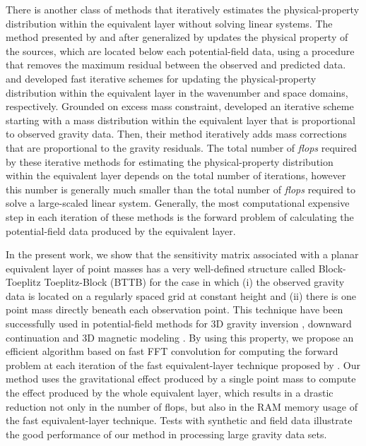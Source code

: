 There is another class of methods that iteratively estimates the physical-property distribution within 
the equivalent layer without solving linear systems.
The method presented by \citet{cordell1992} and after generalized by \citet{guspi-novara2009} updates 
the physical property of the sources, which are located below each potential-field data, using a 
procedure that removes the maximum residual between the observed and predicted data.
\citet{xia-sprowl1991} and \citet{xia-etal1993} developed 
fast iterative schemes for updating the physical-property distribution
within the equivalent layer in the wavenumber and space domains, respectively.
Grounded on excess mass constraint, \cite{siqueira-etal2017} developed an iterative scheme 
starting with a mass distribution within the equivalent layer that is proportional to observed gravity data.
Then, their method iteratively adds mass corrections that are proportional to the gravity residuals.
The total number of \textit{flops} required by these iterative methods for estimating the physical-property 
distribution within the equivalent layer depends on the total number of iterations, however this number is 
generally much smaller than the total number of \textit{flops} required to solve a large-scaled linear system. 
Generally, the most computational expensive step in each iteration of these methods is the forward problem 
of calculating the potential-field data produced by the equivalent layer.

In the present work, we show that the sensitivity matrix associated with a planar equivalent layer 
of point masses has a very well-defined structure called Block-Toeplitz Toeplitz-Block (BTTB) for 
the case in which (i) the observed gravity data is located on a regularly spaced grid at constant 
height and (ii) there is one point mass directly beneath each observation point.
This technique have been successfully used in potential-field methods for 
3D gravity inversion \citep{zhang-wong2015}, downward continuation 
\citep{zhang-etal2016} and 3D magnetic modeling \citep{qiang_etal2019}.
By using this property, we propose an efficient algorithm based on fast FFT convolution 
\citep[e.g.,][ p. 207]{vanloan1992} for computing the forward problem at each iteration of 
the fast equivalent-layer technique proposed by \citet{siqueira-etal2017}.
Our method uses the gravitational effect produced by a single point mass to compute the 
effect produced by the whole equivalent layer, which results in a drastic reduction 
not only in the number of flops, but also in the RAM memory usage of the fast equivalent-layer technique.
Tests with synthetic and field data illustrate the good performance of our method in processing 
large gravity data sets.



